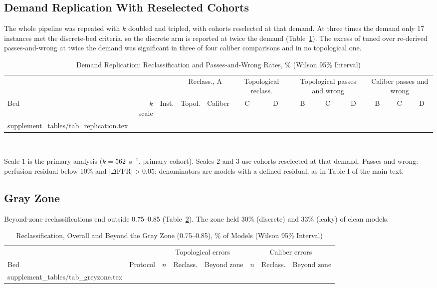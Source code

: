\documentclass[journal,twoside,web,onecolumn]{ieeecolor}
\begin{document}
\subsection{Demand Replication With Reselected Cohorts}\label{sec:replication}
The whole pipeline was repeated with $k$ doubled and tripled, with cohorts reselected at that demand. At three times
the demand only 17 instances met the discrete-bed criteria, so the discrete arm is reported at twice the demand
(Table~\ref{tab:repl}). The excess of tuned over re-derived passes-and-wrong at twice the demand was significant in
three of four caliber comparisons and in no topological one.
\begin{table}[!ht]
\caption{Demand Replication: Reclassification and Passes-and-Wrong Rates, \% (Wilson 95\% Interval)}\label{tab:repl}
\centering\footnotesize\setlength{\tabcolsep}{3pt}
\begin{tabular}{@{}lrrcccccccccc@{}}
\toprule
 & & & \multicolumn{2}{c}{Reclass., A} & \multicolumn{2}{c}{Topological reclass.} & \multicolumn{3}{c}{Topological passes and wrong} & \multicolumn{3}{c}{Caliber passes and wrong}\\
\cmidrule(lr){4-5}\cmidrule(lr){6-7}\cmidrule(lr){8-10}\cmidrule(l){11-13}
Bed & $k$ scale & Inst. & Topol. & Caliber & C & D & B & C & D & B & C & D\\
\midrule
{} supplement_tables/tab_replication.tex 
\bottomrule
\end{tabular}
\\[3pt]
\parbox{0.95\textwidth}{\footnotesize Scale 1 is the primary analysis ($k = 562$~s$^{-1}$, primary cohort). Scales 2 and 3 use
cohorts reselected at that demand. Passes and wrong: perfusion residual below 10\% and $|\Delta\mathrm{FFR}| > 0.05$;
denominators are models with a defined residual, as in Table I of the main text.}
\end{table}

\FloatBarrier
{}
\subsection{Gray Zone}\label{sec:gray}
Beyond-zone reclassifications end outside 0.75--0.85 (Table~\ref{tab:gray}). The zone held 30\% (discrete) and 33\% (leaky) of clean models.
\begin{table}[!ht]
\caption{Reclassification, Overall and Beyond the Gray Zone (0.75--0.85), \% of Models (Wilson 95\% Interval)}\label{tab:gray}
\centering\footnotesize
\begin{tabular}{@{}llrccrcc@{}}
\toprule
 & & \multicolumn{3}{c}{Topological errors} & \multicolumn{3}{c}{Caliber errors}\\
\cmidrule(lr){3-5}\cmidrule(l){6-8}
Bed & Protocol & $n$ & Reclass. & Beyond zone & $n$ & Reclass. & Beyond zone\\
\midrule
{} supplement_tables/tab_greyzone.tex 
\bottomrule
\end{tabular}
\end{table}
\end{document}
